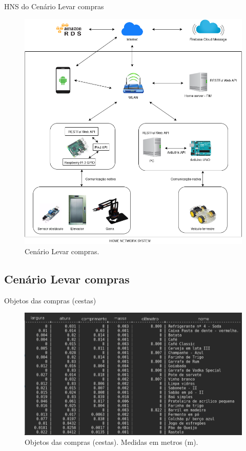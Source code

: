 \documentclass[brazil]{beamer}
\begin{document}
\begin{frame}{HNS do Cenário Levar compras}
\begin{figure}[!htb] \centering 
  \centering
  \includegraphics[width=0.7\columnwidth]{slide/cenario} 
  \caption{Cenário Levar compras.} 
  \label{fig:hns}
\end{figure}
\end{frame}


\subsection{Cenário Levar compras}
\begin{frame}{Objetos das compras (cestas)}
\begin{figure}[!htb] \centering 
  \centering
  \includegraphics[width=0.9\columnwidth]{slide/lista_items} 
  \caption{Objetos das compras (cestas). Medidas em metros (m).} 
  \label{fig:lista_items}
\end{figure}
\end{frame}
\end{document}

